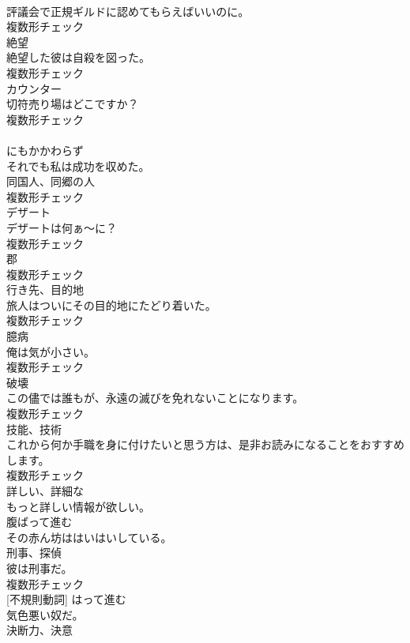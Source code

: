 \documentclass[8pt]{extreport}
\begin{document}
\begin{CJK}{UTF8}{min}
\\	評議会で正規ギルドに認めてもらえばいいのに。	
\\	複数形チェック
\\	[名詞]	絶望	
\\	絶望した彼は自殺を図った。	
\\	複数形チェック
\\	[名詞]	カウンター	
\\	切符売り場はどこですか？	
\\	複数形チェック
\\	[前置詞]	
\\	にもかかわらず	
\\	それでも私は成功を収めた。	
\\	[名詞]	同国人、同郷の人	
\\	複数形チェック
\\	[名詞]	デザート	
\\	デザートは何ぁ～に？	
\\	複数形チェック
\\	[名詞]	郡	
\\	複数形チェック
\\	[名詞]	行き先、目的地	
\\	旅人はついにその目的地にたどり着いた。	
\\	複数形チェック
\\	[名詞]	臆病	
\\	俺は気が小さい。	
\\	複数形チェック
\\	[名詞]	破壊	
\\	この儘では誰もが、永遠の滅びを免れないことになります。	
\\	複数形チェック
\\	[名詞]	技能、技術	
\\	これから何か手職を身に付けたいと思う方は、是非お読みになることをおすすめします。	
\\	複数形チェック
\\	[形容詞]	詳しい、詳細な	
\\	もっと詳しい情報が欲しい。	
\\	[動詞]	腹ばって進む	
\\	その赤ん坊ははいはいしている。	
\\	[名詞]	刑事、探偵	
\\	彼は刑事だ。	
\\	複数形チェック
\\	[動詞] [不規則動詞]	はって進む	
\\	気色悪い奴だ。	
\\	[名詞]	決断力、決意	

\end{CJK}
\end{document}
